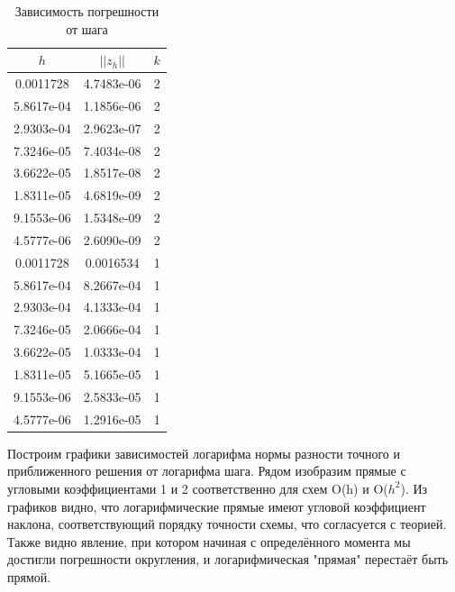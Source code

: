 \documentclass[12pt]{article}
\begin{document}
\begin{table}[H]
\caption{Зависимость погрешности от шага}
\begin{center}
\begin{tabular}{|c|c|c|}
\hline
$h$ & $||z_h||$ & $k$ \\
\hline
0.0011728 & 4.7483e-06 & 2 \\
\hline
5.8617e-04 & 1.1856e-06 & 2 \\
\hline
2.9303e-04 & 2.9623e-07 & 2 \\
\hline
7.3246e-05 & 7.4034e-08 & 2 \\
\hline
3.6622e-05 & 1.8517e-08 & 2 \\
\hline
1.8311e-05 & 4.6819e-09 & 2 \\
\hline
9.1553e-06 & 1.5348e-09 & 2 \\
\hline
4.5777e-06 & 2.6090e-09 & 2 \\
\hline
\hline
0.0011728 & 0.0016534 & 1 \\
\hline
5.8617e-04 & 8.2667e-04 & 1 \\
\hline
2.9303e-04 & 4.1333e-04 & 1 \\
\hline
7.3246e-05 & 2.0666e-04 & 1 \\
\hline
3.6622e-05 & 1.0333e-04 & 1 \\
\hline
1.8311e-05 & 5.1665e-05 & 1 \\
\hline
9.1553e-06 & 2.5833e-05 & 1 \\
\hline
4.5777e-06 & 1.2916e-05 & 1 \\
\hline
\end{tabular}
\end{center}
\end{table}

Построим графики зависимостей логарифма нормы разности точного и приближенного решения от логарифма шага. Рядом изобразим прямые с угловыми коэффициентами 1 и 2 соответственно для схем O(h) и O($h^2$). Из графиков видно, что логарифмические прямые имеют угловой коэффициент наклона, соответствующий порядку точности схемы, что согласуется с теорией. Также видно явление, при котором начиная с определённого момента мы достигли погрешности округления, и логарифмическая "прямая" перестаёт быть прямой.

\newpage
\end{document}
